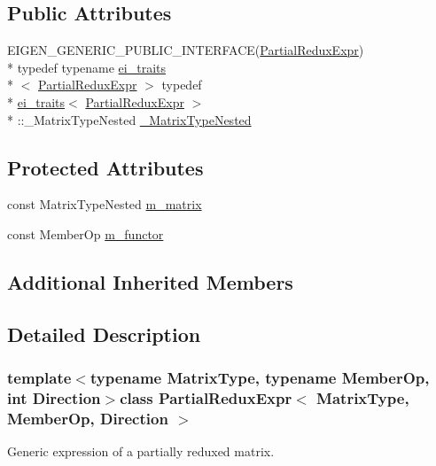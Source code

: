 \subsection*{Public Attributes}
\begin{DoxyCompactItemize}
\item 
E\-I\-G\-E\-N\-\_\-\-G\-E\-N\-E\-R\-I\-C\-\_\-\-P\-U\-B\-L\-I\-C\-\_\-\-I\-N\-T\-E\-R\-F\-A\-C\-E(\hyperlink{class_partial_redux_expr}{Partial\-Redux\-Expr}) \\*
typedef typename \hyperlink{structei__traits}{ei\-\_\-traits}\\*
$<$ \hyperlink{class_partial_redux_expr}{Partial\-Redux\-Expr} $>$ typedef \\*
\hyperlink{structei__traits}{ei\-\_\-traits}$<$ \hyperlink{class_partial_redux_expr}{Partial\-Redux\-Expr} $>$\\*
\-::\-\_\-\-Matrix\-Type\-Nested \hyperlink{class_partial_redux_expr_a723596543a966e792a6ee7e7e7256cb7}{\-\_\-\-Matrix\-Type\-Nested}
\end{DoxyCompactItemize}
\subsection*{Protected Attributes}
\begin{DoxyCompactItemize}
\item 
const Matrix\-Type\-Nested \hyperlink{class_partial_redux_expr_a2fcdb28629c5ec9a2a6316e4b37e5a9a}{m\-\_\-matrix}
\item 
const Member\-Op \hyperlink{class_partial_redux_expr_a3dfaaa54862c84c1aa2308fc9d8fc03e}{m\-\_\-functor}
\end{DoxyCompactItemize}
\subsection*{Additional Inherited Members}


\subsection{Detailed Description}
\subsubsection*{template$<$typename Matrix\-Type, typename Member\-Op, int Direction$>$class Partial\-Redux\-Expr$<$ Matrix\-Type, Member\-Op, Direction $>$}

Generic expression of a partially reduxed matrix. 


